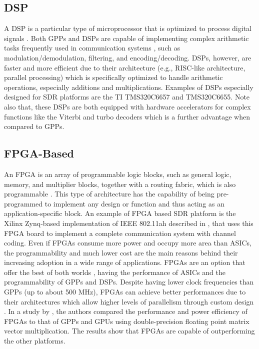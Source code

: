 \subsection{DSP}

A DSP is a particular type of microprocessor that is optimized to process digital signals \cite{rabiner1978a}. Both GPPs and DSPs are capable of implementing complex arithmetic tasks frequently used in communication systems \cite{smith1997a}, such as modulation/demodulation, filtering, and encoding/decoding. DSPs, however, are faster and more efficient due to their architecture (e.g., RISC-like architecture, parallel processing) which is specifically optimized to handle arithmetic operations, especially additions and multiplications. Examples of DSPs especially designed for SDR platforms are the TI TMS320C6657 and TMS320C6655. Note also that, these DSPs are both equipped with hardware accelerators for complex functions like the Viterbi and turbo decoders \cite{unknown-i} which is a further advantage when compared to GPPs.

\subsection{FPGA-Based}

An FPGA is an array of programmable logic blocks, such as general logic, memory, and multiplier blocks, together with a routing fabric, which is also programmable \cite{kuon2008a}. This type of architecture has the capability of being pre-programmed to implement any design or function and thus acting as an application-specific block. An example of FPGA based SDR platform is the Xilinx Zynq-based implementation of IEEE 802.11ah described in \cite{80211ah_for_iot}, that uses this FPGA board to implement a complete communication system with channel coding. Even if FPGAs consume more power and occupy more area than ASICs, the programmability and much lower cost are the main reasons behind their increasing adoption in a wide range of applications. FPGAs are an option that offer the best of both worlds \cite{kuon2008a}, having the performance of ASICs and the programmability of GPPs and DSPs. Despite having lower clock frequencies than GPPs (up to about 500 MHz), FPGAs can achieve better performances due to their architectures which allow higher levels of parallelism through custom design \cite{sano2017a}. In a study by \cite{kestur2010a}, the authors compared the performance and power efficiency of FPGAs to that of GPPs and GPUs using double-precision floating point matrix vector multiplication. The results show that FPGAs are capable of outperforming the other platforms.

